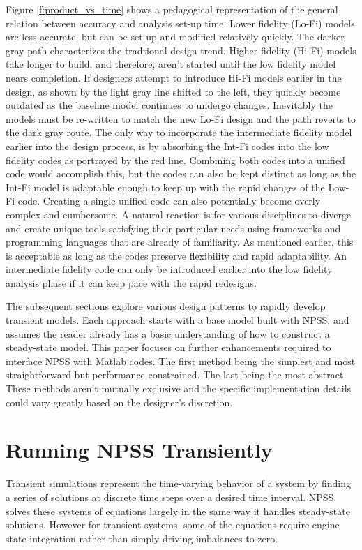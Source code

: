 \documentclass[heading.tex]{subfiles}
\begin{document}
Figure \ref{f:product_vs_time} shows a pedagogical representation of the general relation between
accuracy and analysis set-up time. Lower fidelity (Lo-Fi) models are less accurate, but can be set
up and modified relatively quickly. The darker gray path characterizes the tradtional design
trend. Higher fidelity (Hi-Fi) models take longer to build, and therefore, aren't started until
the low fidelity model nears completion. If designers attempt to introduce Hi-Fi models earlier in
the design, as shown by the light gray line shifted to the left, they quickly become outdated as
the baseline model continues to undergo changes. Inevitably the models must be re-written to match
the new Lo-Fi design and the path reverts to the dark gray route. The only way to incorporate the
intermediate fidelity model earlier into the design process, is by absorbing the Int-Fi codes into
the low fidelity codes as portrayed by the red line. Combining both codes into a unified code
would accomplish this, but the codes can also be kept distinct as long as the Int-Fi model is
adaptable enough to keep up with the rapid changes of the Low-Fi code. Creating a single unified
code can also potentially become overly complex and cumbersome. A natural reaction is for various
disciplines to diverge and create unique tools satisfying their particular needs using frameworks
and programming languages that are already of familiarity. As mentioned earlier, this is
acceptable as long as the codes preserve flexibility and rapid adaptability. An intermediate
fidelity code can only be introduced earlier into the low fidelity analysis phase if it can keep
pace with the rapid redesigns.

The subsequent sections explore various design patterns to rapidly develop transient models. Each
approach starts with a base model built with NPSS, and assumes the reader already has a basic
understanding of how to construct a steady-state model. This paper focuses on further enhancements
required to interface NPSS with Matlab codes. The first method being the simplest and most
straightforward but performance constrained. The last being the most abstract. These methods
aren't mutually exclusive and the specific implementation details could vary greatly based on the
designer's discretion. 


\section{Running NPSS Transiently}

Transient simulations represent the time-varying behavior of a system by finding a series of
solutions at discrete time steps over a desired time interval. NPSS solves these systems of
equations largely in the same way it handles steady-state solutions. However for transient
systems, some of the equations require engine state integration rather than simply driving imbalances to zero. 
\end{document}
